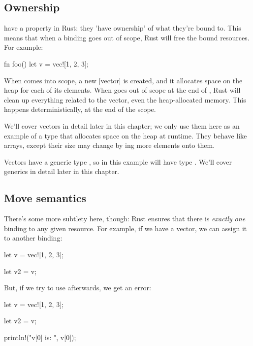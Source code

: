 \subsection*{Ownership}

 have a property in Rust: they 'have ownership' of what they're bound to. This means that when 
a binding goes out of scope, Rust will free the bound resources. For example:

\begin{rustc}
fn foo() {
    let v = vec![1, 2, 3];
}
\end{rustc}

When  comes into scope, a new [vector] is created, and it allocates space on the heap for each of its elements. When 
goes out of scope at the end of , Rust will clean up everything related to the vector, even the heap-allocated memory. 
This happens deterministically, at the end of the scope.

\blank

We'll cover vectors in detail later in this chapter; we only use them here as an example of a type that allocates space on the 
heap at runtime. They behave like arrays, except their size may change by ing more elements onto them.

\blank

Vectors have a generic type , so in this example  will have type . We'll cover generics 
in detail later in this chapter.

\subsection*{Move semantics}

There's some more subtlety here, though: Rust ensures that there is \emph{exactly one} binding to any given resource. For 
example, if we have a vector, we can assign it to another binding:

\begin{rustc}
let v = vec![1, 2, 3];

let v2 = v;
\end{rustc}

But, if we try to use  afterwards, we get an error:

\begin{rustc}
let v = vec![1, 2, 3];

let v2 = v;

println!("v[0] is: {}", v[0]);
\end{rustc}

